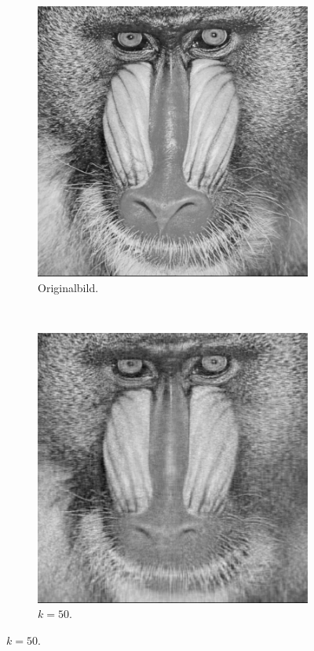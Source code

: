 \documentclass{scrartcl}
\begin{document}
        \begin{figure}
            \centering
            \begin{subfigure}[b]{0.3\textwidth}
                \includegraphics[width=\textwidth]{A1/build/bild.pdf}
                \caption{Originalbild.}
                \label{fig:bild}
            \end{subfigure}
            ~ %
            \begin{subfigure}[b]{0.3\textwidth}
                \includegraphics[width=\textwidth]{A1/build/A50.pdf}
                \caption{$k=50$.}
                \label{fig:A50}
            \end{subfigure}
            

\end{figure}
\end{document}
